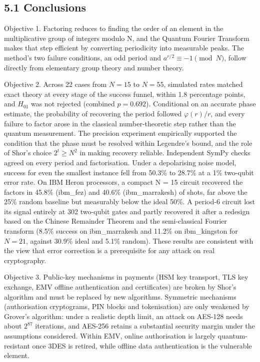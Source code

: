 \documentclass[12pt,oneside]{report}
\begin{document}
\subsection*{5.1 Conclusions}

Objective 1. Factoring reduces to finding the order of an element in the multiplicative group of integers modulo N, and the Quantum Fourier Transform makes that step efficient by converting periodicity into measurable peaks. The method's two failure conditions, an odd period and $a^{r/2} \equiv -1 \pmod{N}$, follow directly from elementary group theory and number theory.
\par

Objective 2. Across 22 cases from $N = 15$ to $N = 55$, simulated rates matched exact theory at every stage of the success funnel, within 1.8 percentage points, and $H_{01}$ was not rejected (combined $p = 0.692$). Conditional on an accurate phase estimate, the probability of recovering the period followed $\varphi(r)/r$, and every failure to factor arose in the classical number-theoretic step rather than the quantum measurement. The precision experiment empirically supported the condition that the phase must be resolved within Legendre's bound, and the role of Shor's choice $2^{t} \ge N^{2}$ in making recovery reliable. Independent SymPy checks agreed on every period and factorisation. Under a depolarising noise model, success for even the smallest instance fell from 50.3\% to 28.7\% at a 1\% two-qubit error rate. On IBM Heron processors, a compact N = 15 circuit recovered the factors in 45.8\% (ibm\_fez) and 40.6\% (ibm\_marrakesh) of shots, far above the 25\% random baseline but measurably below the ideal 50\%. A period-6 circuit lost its signal entirely at 302 two-qubit gates and partly recovered it after a redesign based on the Chinese Remainder Theorem and the semi-classical Fourier transform (8.5\% success on ibm\_marrakesh and 11.2\% on ibm\_kingston for $N = 21$, against 30.9\% ideal and 5.1\% random). These results are consistent with the view that error correction is a prerequisite for any attack on real cryptography.
\par

Objective 3. Public-key mechanisms in payments (HSM key transport, TLS key exchange, EMV offline authentication and certificates) are broken by Shor's algorithm and must be replaced by new algorithms. Symmetric mechanisms (authorisation cryptograms, PIN blocks and tokenisation) are only weakened by Grover's algorithm: under a realistic depth limit, an attack on AES-128 needs about $2^{87}$ iterations, and AES-256 retains a substantial security margin under the assumptions considered. Within EMV, online authorisation is largely quantum-resistant once 3DES is retired, while offline data authentication is the vulnerable element.
\par
\end{document}
